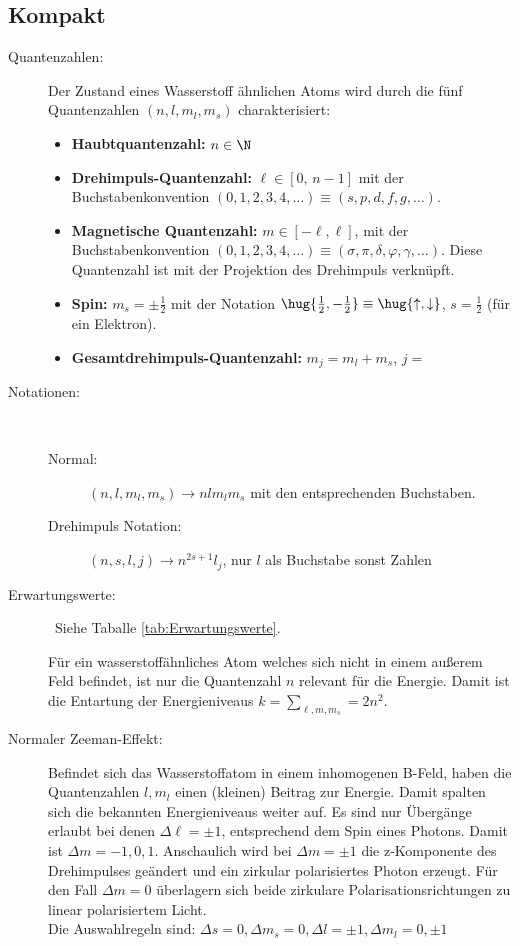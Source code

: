 \documentclass[twocolumn]{summery_4.1}
\begin{document}
\subsection{Kompakt} 
\begin{description}
    \item[Quantenzahlen:]
    Der Zustand eines Wasserstoff ähnlichen Atoms wird durch die fünf Quantenzahlen $(n,l,m_l,m_s)$ charakterisiert:
    \begin{itemize}
        \item {\bf Haubtquantenzahl:} \(
            n\in\N\)
        \item {\bf Drehimpuls-Quantenzahl:} \(\ell\in[0,\,n-1]\)
        mit der Buchstabenkonvention \((0,1,2,3,4,\dots)\equiv (s,p,d,f,g,\dots)\). 
        \item {\bf Magnetische Quantenzahl:} \(m\in[-\ell,\ell]\), mit der Buchstabenkonvention
        \((0,1,2,3,4,\dots)\equiv (\sigma, \pi, \delta, \varphi, \gamma,\dots )\).
        Diese Quantenzahl ist mit der Projektion des Drehimpuls verknüpft.
        \item {\bf Spin:} \(m_s = \pm \frac12\) mit der Notation \(\hug{\frac12, -\frac12}\equiv \hug{\uparrow, \downarrow}\), \(s = \frac12\) (für ein Elektron). 
        \item {\bf Gesamtdrehimpuls-Quantenzahl:} \(m_j = m_l + m_s\), \(j=\)
    \end{itemize} 

    \item[Notationen:]\,
    
        \begin{description}
            \item[{\normalfont Normal:}] \((n,l,m_l,m_s) \to nlm_lm_s\) mit den entsprechenden Buchstaben.
            \item[{\normalfont  Drehimpuls Notation:}] \((n,s,l,j)\to n^{2s+1}l_j\), nur \(l\) als Buchstabe sonst Zahlen
        \end{description}

    \item[Erwartungswerte:]\,
    Siehe Taballe \ref{tab:Erwartungswerte}.

    
    Für ein wasserstoffähnliches Atom welches sich nicht in einem außerem Feld befindet, ist nur die Quantenzahl \(n\) relevant für die Energie. Damit ist die Entartung der Energieniveaus \(k= \sum_{\ell,m,m_s} =2n^2 \).  

    \item[Normaler Zeeman-Effekt:]
    Befindet sich das Wasserstoffatom in einem inhomogenen B-Feld, haben die Quantenzahlen \(l,m_l\) einen (kleinen) Beitrag zur Energie. Damit spalten sich die bekannten Energieniveaus weiter auf.     
    Es sind nur Übergänge erlaubt bei denen \(\Delta \ell=\pm 1\), entsprechend dem Spin eines Photons. Damit ist \(\Delta m = -1,0,1\).
    Anschaulich wird bei $\Delta m = \pm1$ die z-Komponente des Drehimpulses geändert
    und ein zirkular polarisiertes Photon erzeugt. Für den Fall $\Delta m = 0$ überlagern sich beide zirkulare
    Polarisationsrichtungen zu linear polarisiertem Licht.\\
    Die Auswahlregeln sind: \(\Delta s = 0, \Delta m_s=0, \Delta l =\pm 1, \Delta m_l = 0,\pm1\)


\end{description}
\end{document}

